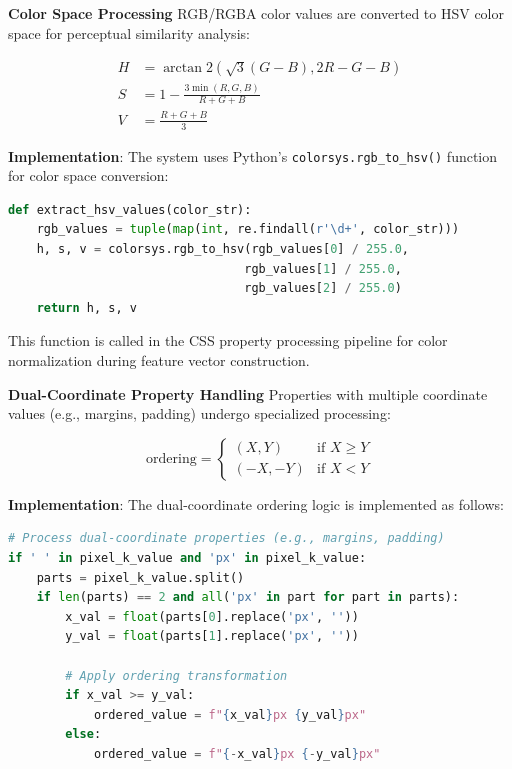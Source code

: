 \textbf{Color Space Processing}
RGB/RGBA color values are converted to HSV color space for perceptual similarity analysis:

\begin{align}
H &= \arctan2(\sqrt{3}(G-B), 2R-G-B) \\
S &= 1 - \frac{3\min(R,G,B)}{R+G+B} \\
V &= \frac{R+G+B}{3}
\end{align}

\textbf{Implementation}: The system uses Python's \texttt{colorsys.rgb\_to\_hsv()} function for color space conversion:

\begin{tcolorbox}[
    colback=gray!5!white,
    colframe=gray!60!black,
    title=\textbf{HSV Color Space Conversion},
    fonttitle=\bfseries,
    enhanced,
    arc=2mm,
    boxrule=0.5pt
]
\begin{lstlisting}[language=Python]
def extract_hsv_values(color_str):
    rgb_values = tuple(map(int, re.findall(r'\d+', color_str)))
    h, s, v = colorsys.rgb_to_hsv(rgb_values[0] / 255.0, 
                                 rgb_values[1] / 255.0, 
                                 rgb_values[2] / 255.0)
    return h, s, v
\end{lstlisting}
\end{tcolorbox}

This function is called in the CSS property processing pipeline for color normalization during feature vector construction.

\textbf{Dual-Coordinate Property Handling}
Properties with multiple coordinate values (e.g., margins, padding) undergo specialized processing:

\begin{equation}
\text{ordering} = \begin{cases}
(X, Y) & \text{if } X \geq Y \\
(-X, -Y) & \text{if } X < Y
\end{cases}
\end{equation}

\textbf{Implementation}: The dual-coordinate ordering logic is implemented as follows:

\begin{tcolorbox}[
    colback=gray!5!white,
    colframe=gray!60!black,
    title=\textbf{Dual-Coordinate CSS Property Processing},
    fonttitle=\bfseries,
    enhanced,
    arc=2mm,
    boxrule=0.5pt
]
\begin{lstlisting}[language=Python]
# Process dual-coordinate properties (e.g., margins, padding)
if ' ' in pixel_k_value and 'px' in pixel_k_value:
    parts = pixel_k_value.split()
    if len(parts) == 2 and all('px' in part for part in parts):
        x_val = float(parts[0].replace('px', ''))
        y_val = float(parts[1].replace('px', ''))
        
        # Apply ordering transformation
        if x_val >= y_val:
            ordered_value = f"{x_val}px {y_val}px"
        else:
            ordered_value = f"{-x_val}px {-y_val}px"
\end{lstlisting}
\end{tcolorbox}

